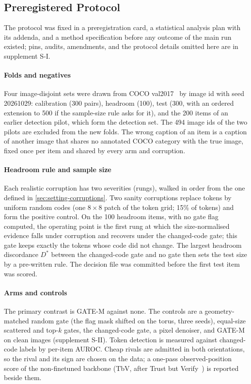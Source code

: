 \subsection{Preregistered Protocol}\label{sec:study1-protocol}
The protocol was fixed in a preregistration card, a statistical analysis plan with its addenda, and a method specification before any
outcome of the main run existed; pins, audits, amendments, and the protocol details omitted here are in supplement S-I.

\paragraph*{Folds and negatives}
Four image-disjoint sets were drawn from COCO val2017~\cite{lin2014coco} by image id with seed 20261029: calibration (300 pairs),
headroom (100), test (300, with an ordered extension to 500 if the sample-size rule asks for it), and the 200 items of an earlier
detection pilot, which form the detection set.
The 494 image ids of the two pilots are excluded from the new folds.
The wrong caption of an item is a caption of another image that shares no annotated COCO category with the true image, fixed once per
item and shared by every arm and corruption.

\paragraph*{Headroom rule and sample size}
Each realistic corruption has two severities (rungs), walked in order from the one defined in \cref{sec:setting-corruptions}.
Two sanity corruptions replace tokens by uniform random codes (one $8\times8$ patch of the token grid; 15\% of tokens) and form the
positive control.
On the 100 headroom items, with no gate flag computed, the operating point is the first rung at which the size-normalised evidence falls
under corruption and recovers under the changed-code gate; this gate keeps exactly the tokens whose code did not change.
The largest headroom discordance $D^\ast$ between the changed-code gate and no gate then sets the test size by a pre-written rule.
The decision file was committed before the first test item was scored.

\paragraph*{Arms and controls}
The primary contrast is GATE-M against none.
The controls are a geometry-matched random gate (the flag mask shifted on the torus, three seeds), equal-size scattered and top-$k$ gates,
the changed-code gate, a pixel denoiser, and GATE-M on clean images (supplement S-II).
Token detection is measured against changed-code labels by per-item AUROC.
Cheap rivals are admitted in both orientations, so the rival and its sign are chosen on the data; a one-pass observed-position score of
the non-finetuned backbone (TbV, after Trust but Verify~\cite{jhingran2026trustverify}) is reported beside them.

